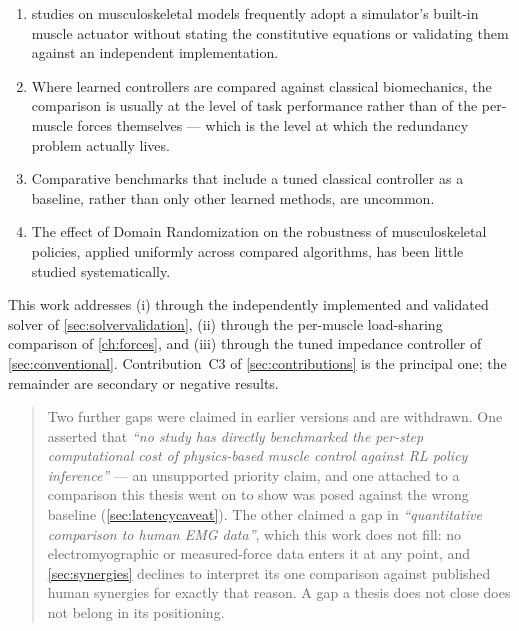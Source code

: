 \begin{enumerate}[label=(\roman*)]
  \item \DRL{} studies on musculoskeletal models frequently adopt a simulator's
        built-in muscle actuator without stating the constitutive equations or
        validating them against an independent implementation.
  \item Where learned controllers are compared against classical biomechanics,
        the comparison is usually at the level of task performance rather than
        of the per-muscle forces themselves --- which is the level at which the
        redundancy problem actually lives.
  \item Comparative benchmarks that include a tuned classical controller as a
        baseline, rather than only other learned methods, are uncommon.
  \item The effect of Domain Randomization on the robustness of musculoskeletal
        policies, applied uniformly across compared algorithms, has been little
        studied systematically.
\end{enumerate}

This work addresses (i) through the independently implemented and validated
solver of \cref{sec:solvervalidation}, (ii) through the per-muscle load-sharing
comparison of \cref{ch:forces}, and (iii) through the tuned impedance controller
of \cref{sec:conventional}. Contribution~C3 of \cref{sec:contributions} is the
principal one; the remainder are secondary or negative results.

\begin{quote}
\small
Two further gaps were claimed in earlier versions and are withdrawn. One asserted
that \emph{``no study has directly benchmarked the per-step computational cost of
physics-based muscle control against RL policy inference''} --- an unsupported
priority claim, and one attached to a comparison this thesis went on to show was
posed against the wrong baseline (\cref{sec:latencycaveat}). The other claimed a
gap in \emph{``quantitative comparison to human EMG data''}, which this work does
not fill: no electromyographic or measured-force data enters it at any point, and
\cref{sec:synergies} declines to interpret its one comparison against published
human synergies for exactly that reason. A gap a thesis does not close does not
belong in its positioning.
\end{quote}
